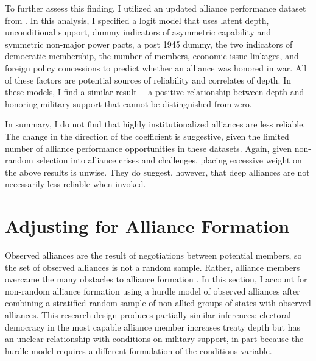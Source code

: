\documentclass[12pt]{article}
\begin{document}
To further assess this finding, I utilized an updated alliance performance dataset from \citet{BerkemeierFuhrmann2018}.
In this analysis, I specified a logit model that uses latent depth, unconditional support, dummy indicators of asymmetric capability and symmetric non-major power pacts, a post 1945 dummy, the two indicators of democratic membership, the number of members, economic issue linkages, and foreign policy concessions to predict whether an alliance was honored in war. 
All of these factors are potential sources of reliability and correlates of depth. 
In these models, I find a similar result--- a positive relationship between depth and honoring military support that cannot be distinguished from zero.


In summary, I do not find that highly institutionalized alliances are less reliable. 
The change in the direction of the coefficient is suggestive, given the limited number of alliance performance opportunities in these datasets. 
Again, given non-random selection into alliance crises and challenges, placing excessive weight on the above results is unwise. 
They do suggest, however, that deep alliances are not necessarily less reliable when invoked. 



\section{Adjusting for Alliance Formation}



Observed alliances are the result of negotiations between potential members, so the set of observed alliances is not a random sample.
Rather, alliance members overcame the many obstacles to alliance formation \citep{Poast2019a}.  
In this section, I account for non-random alliance formation using a hurdle model of observed alliances after combining a stratified random sample of non-allied groups of states with observed alliances. 
This research design produces partially similar inferences: electoral democracy in the most capable alliance member increases treaty depth but has an unclear relationship with conditions on military support, in part because the hurdle model requires a different formulation of the conditions variable. 
\end{document}
